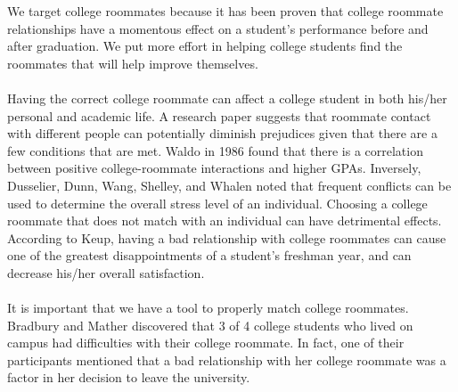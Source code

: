 \documentclass[journal]{./IEEE/IEEEtran}
\begin{document}
    We target college roommates because it has been proven that college roommate relationships have a momentous effect on a student$’$s performance before and after graduation. We put more effort in helping college students find the roommates that will help improve themselves.
    \\
    \\
    Having the correct college roommate can affect a college student in both his/her personal and academic life. A research paper suggests that roommate contact with different people can potentially diminish prejudices given that there are a few conditions that are met. Waldo in 1986 found that there is a correlation between positive college-roommate interactions and higher GPAs. Inversely, Dusselier, Dunn, Wang, Shelley, and Whalen noted that frequent conflicts can be used to determine the overall stress level of an individual\cite{dusselier}. Choosing a college roommate that does not match with an individual can have detrimental effects. According to Keup, having a bad relationship with college roommates can cause one of the greatest disappointments of a student’s freshman year, and can decrease his/her overall satisfaction\cite{keup}.
    \\
    \\
    It is important that we have a tool to properly match college roommates. Bradbury and Mather discovered that 3 of 4 college students who lived on campus had difficulties with their college roommate. In fact, one of their participants mentioned that a bad relationship with her college roommate was a factor in her decision
    to leave the university\cite{bradbury}.
\end{document}
